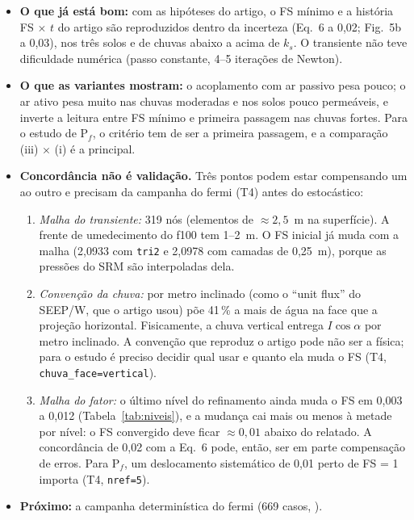 \begin{itemize}
  \item \textbf{O que já está bom:} com as hipóteses do artigo, o FS mínimo e a história FS $\times$ $t$ do artigo são
    reproduzidos dentro da incerteza (Eq.~6 a 0,02; Fig.~5b a 0,03), nos três solos e de chuvas abaixo a acima de
    $k_s$. O transiente não teve dificuldade numérica (passo constante, 4--5 iterações de Newton).
  \item \textbf{O que as variantes mostram:} o acoplamento com ar passivo pesa pouco; o ar ativo pesa muito nas chuvas
    moderadas e nos solos pouco permeáveis, e inverte a leitura entre FS mínimo e primeira passagem nas chuvas fortes.
    Para o estudo de P$_f$, o critério tem de ser a primeira passagem, e a comparação (iii) $\times$ (i) é a principal.
  \item \textbf{Concordância não é validação.} Três pontos podem estar compensando um ao outro e precisam da campanha
    do fermi (T4) antes do estocástico:
    \begin{enumerate}
      \item \emph{Malha do transiente:} 319 nós (elementos de $\approx 2{,}5$~m na superfície). A frente de umedecimento
        do f100 tem 1--2~m. O FS inicial já muda com a malha (2,0933 com \texttt{tri2} e 2,0978 com camadas de
        0,25~m), porque as pressões do SRM são interpoladas dela.
      \item \emph{Convenção da chuva:} por metro inclinado (como o ``unit flux'' do SEEP/W, que o artigo usou) põe
        41\,\% a mais de água na face que a projeção horizontal. Fisicamente, a chuva vertical entrega $I\cos\alpha$
        por metro inclinado. A convenção que reproduz o artigo pode não ser a física; para o estudo é preciso decidir
        qual usar e quanto ela muda o FS (T4, \texttt{chuva\_face=vertical}).
      \item \emph{Malha do fator:} o último nível do refinamento ainda muda o FS em 0,003 a 0,012
        (Tabela~\ref{tab:niveis}), e a mudança cai mais ou menos à metade por nível: o FS convergido deve ficar
        $\approx 0{,}01$ abaixo do relatado. A concordância de 0,02 com a Eq.~6 pode, então, ser em parte
        compensação de erros. Para P$_f$, um deslocamento sistemático de 0,01 perto de FS = 1 importa (T4,
        \texttt{nref=5}).
    \end{enumerate}
  \item \textbf{Próximo:} a campanha determinística do fermi (669 casos,
    ).
\end{itemize}
